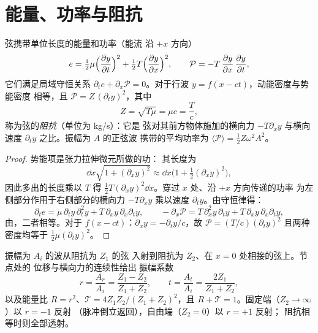 \section{能量、功率与阻抗}

\begin{proposition}[弦波的能量]\label{prop:b2:waves-on-strings:energy}
弦携带单位长度的能量和功率（能流
沿 $+x$ 方向）
\[
e = \tfrac12\mu\Bigl(\frac{\partial y}{\partial t}\Bigr)^2 + \tfrac12T\Bigl(\frac{\partial y}{\partial x}\Bigr)^2 ,
\qquad
\mathcal P = -T\,\frac{\partial y}{\partial x}\,\frac{\partial y}{\partial t} ,
\]
它们满足局域守恒关系 $\partial_te + \partial_x\mathcal P = 0$。对于行波
$y = f(x - ct)$，动能密度与势能密度
相等，且 $\mathcal P = Z\,(\partial_ty)^2$，其中
\[
Z = \sqrt{T\mu} = \mu c = \frac Tc ,
\]
称为弦的\emph{阻抗}（单位为 \unit{kg/s}）：它是
弦对其前方物体施加的横向力 $-T\partial_xy$
与横向速度 $\partial_ty$ 之比。振幅为 $A$ 的正弦波
携带的平均功率为 $\langle\mathcal P\rangle = \tfrac12Z\omega^2A^2$。
\end{proposition}

\begin{proof}
势能项是张力拉伸微元所做的功：
其长度为
\[
\dd x\sqrt{1 + (\partial_xy)^2} \approx \dd x\bigl(1 + \tfrac12(\partial_xy)^2\bigr) ,
\]
因此多出的长度乘以 $T$ 得 $\tfrac12T(\partial_xy)^2\dd x$。穿过 $x$ 处、沿 $+x$ 方向传递的功率
为左侧部分作用于右侧部分的横向力
$-T\partial_xy$ 乘以速度
$\partial_ty$。由守恒律得：
\[
\partial_te = \mu\,\partial_ty\,\partial_t^2y + T\,\partial_xy\,\partial_x\partial_ty ,
\qquad
-\partial_x\mathcal P = T\,\partial_x^2y\,\partial_ty + T\,\partial_xy\,\partial_x\partial_ty ,
\]
由，二者相等。对于 $f(x - ct)$：$\partial_xy = -\partial_ty/c$，故 $\mathcal P = (T/c)
(\partial_ty)^2$ 且两种密度均等于 $\tfrac12\mu(\partial_ty)^2$。
\end{proof}

\begin{proposition}[节点处的反射与透射]\label{prop:b2:waves-on-strings:junction}
振幅为 $A_i$ 的波从阻抗为 $Z_1$ 的弦
入射到阻抗为 $Z_2$、在 $x = 0$ 处相接的弦上。节点处的
位移与横向力的连续性给出
振幅系数
\[
r = \frac{A_r}{A_i} = \frac{Z_1 - Z_2}{Z_1 + Z_2} , \qquad
t = \frac{A_t}{A_i} = \frac{2Z_1}{Z_1 + Z_2} ,
\]
以及能量比 $R = r^2$、$\mathcal T = 4Z_1Z_2/(Z_1 + Z_2)^2$，且
$R + \mathcal T = 1$。固定端（$Z_2 \to \infty$）以 $r = -1$ 反射
（脉冲倒立返回），自由端（$Z_2 = 0$）以 $r = +1$ 反射；
阻抗相等时则全部透射。
\end{proposition}

